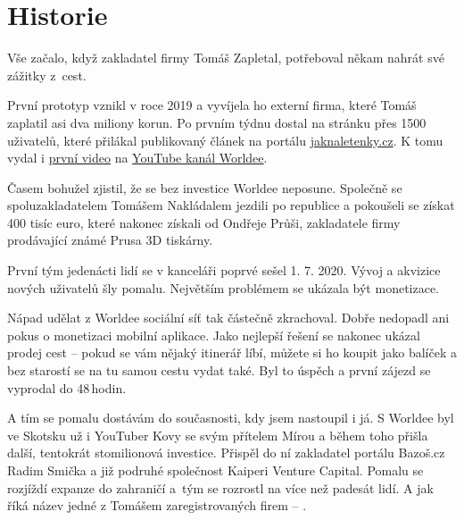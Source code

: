 \section{Historie}

Vše začalo, když zakladatel firmy Tomáš Zapletal, potřeboval někam nahrát své zážitky z~cest.

\begin{displayquote}
\end{displayquote}

První prototyp vznikl v roce 2019 a vyvíjela ho externí firma, které Tomáš zaplatil asi dva miliony korun. Po prvním týdnu dostal na stránku přes 1500 uživatelů, které přilákal publikovaný článek na portálu \href{https://jaknaletenky.cz/cesky-startup-worldee-miri-do-sveta-a-potrebuje-vasi-pomoc.html}{jaknaletenky.cz}. K tomu vydal i \href{https://youtu.be/wJCV-5x0aIk}{první video} na \href{https://www.youtube.com/@worldee8910}{YouTube kanál Worldee}.

Časem bohužel zjistil, že se bez investice Worldee neposune. Společně se spoluzakladatelem Tomášem Nakládalem jezdili po republice a pokoušeli se získat 400 tisíc euro, které nakonec získali od Ondřeje Průši, zakladatele firmy prodávající známé Prusa 3D tiskárny.

První tým jedenácti lidí se v kanceláři poprvé sešel 1. 7. 2020. Vývoj a akvizice nových uživatelů šly pomalu. Největším problémem se ukázala být monetizace.

\begin{displayquote}
\end{displayquote}

Nápad udělat z Worldee sociální síť tak částečně zkrachoval. Dobře nedopadl ani pokus o monetizaci mobilní aplikace. Jako nejlepší řešení se nakonec ukázal prodej cest – pokud se vám nějaký itinerář líbí, můžete si ho koupit jako balíček a bez starostí se na tu samou cestu vydat také. Byl to úspěch a první zájezd se vyprodal do 48\,hodin.

A tím se pomalu dostávám do současnosti, kdy jsem nastoupil i já. S Worldee byl ve Skotsku už i YouTuber Kovy se svým přítelem Mírou\cite{WorldeeKovy} a během toho přišla další, tentokrát stomilionová investice.\cite{WorldeeInvestice} Přispěl do ní zakladatel portálu Bazoš.cz Radim Smička a již podruhé společnost Kaiperi Venture Capital. Pomalu se rozjíždí expanze do zahraničí a~tým se rozrostl na více než padesát lidí. A jak říká název jedné z Tomášem zaregistrovaných firem – .\cite{Podnikani}
